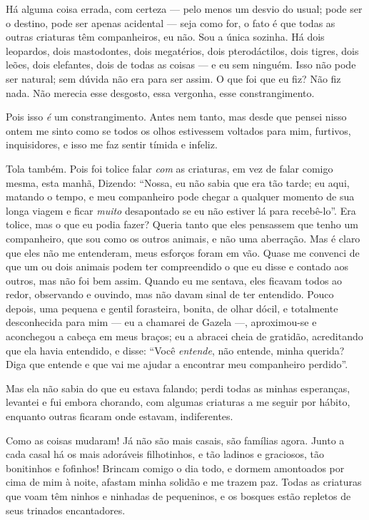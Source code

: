  Há alguma coisa errada, com certeza --- pelo menos um desvio do usual; pode ser
o destino, pode ser apenas acidental --- seja como for, o fato é que todas as outras
criaturas têm companheiros, eu não. Sou a única sozinha. Há dois leopardos, dois mastodontes,
dois megatérios, dois pterodáctilos, dois tigres, dois leões, dois elefantes, dois de todas as coisas
--- e eu sem ninguém. Isso não pode ser natural; sem dúvida não era para ser assim. O que
foi que eu fiz? Não fiz nada. Não merecia esse desgosto, essa vergonha, esse constrangimento.

 Pois isso \textit{é} um constrangimento. Antes nem tanto, mas desde que pensei nisso
ontem me sinto como se todos os olhos estivessem voltados para mim, furtivos, inquisidores,
e isso me faz sentir tímida e infeliz.

Tola também. Pois foi tolice falar \textit{com} as criaturas, em vez de falar comigo mesma, esta manhã,
Dizendo: ``Nossa, eu não sabia que era tão tarde; eu aqui, matando o tempo, e meu companheiro pode chegar
a qualquer momento de sua longa viagem e ficar \textit{muito} desapontado se eu não estiver lá para recebê-lo''.
Era tolice, mas o que eu podia fazer? Queria tanto que eles pensassem que tenho um companheiro,
que sou como os outros animais, e não uma aberração. Mas é claro que eles não me entenderam, meus
esforços foram em vão. Quase me convenci de que um ou dois animais podem ter compreendido
o que eu disse e contado aos outros, mas não foi bem assim. Quando eu me sentava, eles ficavam todos ao
redor, observando e ouvindo, mas não davam sinal de ter entendido. Pouco depois,
uma pequena e gentil forasteira, bonita, de olhar dócil, e totalmente desconhecida para mim --- eu a chamarei
de Gazela ---, aproximou-se e aconchegou a cabeça em meus braços; eu a abracei cheia
de gratidão, acreditando que ela havia entendido, e disse: ``Você \textit{entende}, não entende, minha
querida? Diga que entende e que vai me ajudar a encontrar meu companheiro perdido''.

Mas ela não sabia do que eu estava falando; perdi todas as minhas esperanças, levantei e fui
embora chorando, com algumas criaturas a me seguir por hábito, enquanto outras ficaram onde estavam,
indiferentes.

 Como as coisas mudaram! Já não são mais casais, são famílias agora.       
Junto a cada casal há os mais adoráveis filhotinhos, e tão ladinos e graciosos, tão bonitinhos e fofinhos!
Brincam comigo o dia todo, e dormem amontoados por cima de mim à noite, afastam minha solidão
e me trazem paz. Todas as criaturas que voam têm ninhos e ninhadas de pequeninos, e os bosques
estão repletos de seus trinados encantadores.

